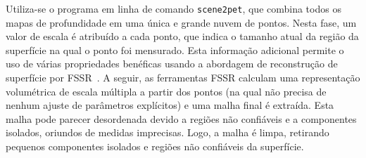 Utiliza-se o programa em linha de comando \texttt{scene2pet}, que combina todos os mapas de
profundidade em uma única e grande nuvem de pontos. Nesta fase, um valor de
escala é atribuído a cada ponto, que indica o tamanho atual da região da
superfície na qual o ponto foi mensurado. Esta informação adicional permite o
uso de várias propriedades benéficas usando a abordagem de reconstrução de
superfície por FSSR~\cite{fuhrmann2014floating}.  A seguir, as ferramentas
FSSR calculam uma representação volumétrica de escala múltipla a partir dos
pontos (na qual não precisa de nenhum ajuste de parâmetros explícitos) e uma
malha final é extraída. Esta malha pode parecer desordenada devido a regiões não
confiáveis e a componentes isolados, oriundos de medidas imprecisas. Logo, a
malha é limpa, retirando pequenos componentes isolados e regiões não confiáveis
da superfície. 




